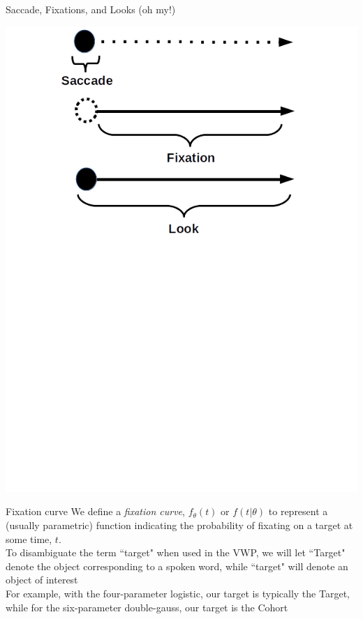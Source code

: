 \documentclass{beamer}
\begin{document}
\begin{frame}{Saccade, Fixations, and Looks (oh my!)}
\vspace{10mm}
\begin{center}
\includegraphics[scale=0.45]{img/saccade_def2.png}
\end{center}
\end{frame}


\begin{frame}{Fixation curve}
We define a \textit{fixation curve}, $f_{\theta}(t)$ or $f(t  | \theta)$ to represent a (usually parametric) function indicating the probability of fixating on a target at some time, $t$. \newline \\
To disambiguate the term ``target" when used in the VWP, we will let ``Target" denote the object corresponding to a spoken word, while ``target" will denote an object of interest \newline \\

For example, with the four-parameter logistic, our target is typically the Target, while for the six-parameter double-gauss, our target is the Cohort
\end{frame}
\end{document}
